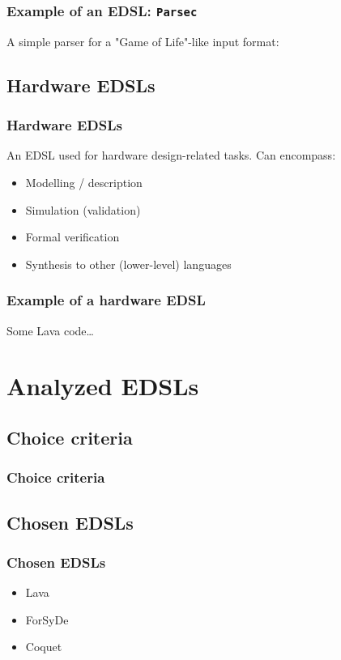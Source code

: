 \documentclass{beamer}
\begin{document}
            \begin{frame}[fragile]
                \frametitle{Example of an EDSL: \texttt{Parsec}}

                A simple parser for a "Game of Life"-like input format:
\end{frame}


        \subsection{Hardware EDSLs}
        \label{subsec:hardware-edsls}
            \begin{frame}
                \frametitle{Hardware EDSLs}
                An EDSL used for hardware design-related tasks. Can encompass:

                \begin{itemize}
                    \item Modelling / description
                    \item Simulation (validation)
                    \item Formal verification
                    \item Synthesis to other (lower-level) languages
                \end{itemize}
            \end{frame}

            \begin{frame}
                \frametitle{Example of a hardware EDSL}

                Some Lava code\ldots
            \end{frame}


    \section{Analyzed EDSLs}
    \label{sec:analyzed-edsls}
        \frame{\sectionpage}

        \subsection{Choice criteria}
        \label{subsec:edsls-choice-criteria}
            \begin{frame}
                \frametitle{Choice criteria}
            \end{frame}

        \subsection{Chosen EDSLs}
        \label{subsec:chosen-edsls}
            \begin{frame}
                \frametitle{Chosen EDSLs}
                \begin{itemize}
                    \item Lava
                    \item ForSyDe
                    \item Coquet
                \end{itemize}
            \end{frame}
\end{document}
